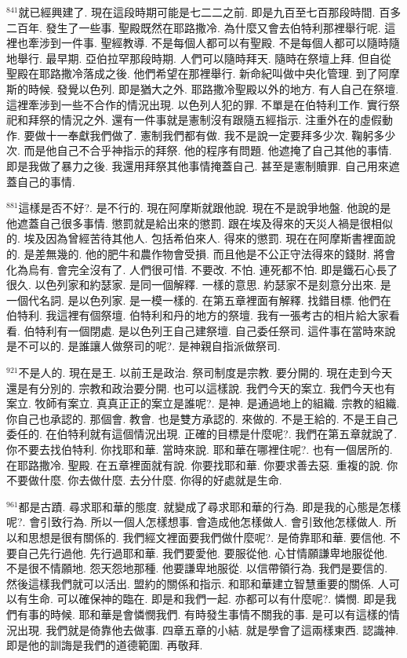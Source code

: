 \documentclass{book}
\begin{document}
$^{841}$就已經興建了.
現在這段時期可能是七二二之前.
即是九百至七百那段時間.
百多二百年.
發生了一些事.
聖殿既然在耶路撒冷.
為什麼又會去伯特利那裡舉行呢.
這裡也牽涉到一件事.
聖經教導.
不是每個人都可以有聖殿.
不是每個人都可以隨時隨地舉行.
最早期.
亞伯拉罕那段時期.
人們可以隨時拜天.
隨時在祭壇上拜.
但自從聖殿在耶路撒冷落成之後.
他們希望在那裡舉行.
新命紀叫做中央化管理.
到了阿摩斯的時候.
發覺以色列.
即是猶大之外.
耶路撒冷聖殿以外的地方.
有人自己在祭壇.
這裡牽涉到一些不合作的情況出現.
以色列人犯的罪.
不單是在伯特利工作.
實行祭祀和拜祭的情況之外.
還有一件事就是憲制沒有跟隨五經指示.
注重外在的虛假動作.
要做十一奉獻我們做了.
憲制我們都有做.
我不是說一定要拜多少次.
鞠躬多少次.
而是他自己不合乎神指示的拜祭.
他的程序有問題.
他遮掩了自己其他的事情.
即是我做了暴力之後.
我還用拜祭其他事情掩蓋自己.
甚至是憲制贖罪.
自己用來遮蓋自己的事情.

$^{881}$這樣是否不好?.
是不行的.
現在阿摩斯就跟他說.
現在不是說爭地盤.
他說的是他遮蓋自己很多事情.
懲罰就是給出來的懲罰.
跟在埃及得來的天災人禍是很相似的.
埃及因為曾經苦待其他人.
包括希伯來人.
得來的懲罰.
現在在阿摩斯書裡面說的.
是差無幾的.
他的肥牛和農作物會受損.
而且他是不公正守法得來的錢財.
將會化為烏有.
會完全沒有了.
人們很可惜.
不要改.
不怕.
連死都不怕.
即是鐵石心長了很久.
以色列家和約瑟家.
是同一個解釋.
一樣的意思.
約瑟家不是刻意分出來.
是一個代名詞.
是以色列家.
是一模一樣的.
在第五章裡面有解釋.
找錯目標.
他們在伯特利.
我這裡有個祭壇.
伯特利和丹的地方的祭壇.
我有一張考古的相片給大家看看.
伯特利有一個閉處.
是以色列王自己建祭壇.
自己委任祭司.
這件事在當時來說是不可以的.
是誰讓人做祭司的呢?.
是神親自指派做祭司.

$^{921}$不是人的.
現在是王.
以前王是政治.
祭司制度是宗教.
要分開的.
現在走到今天還是有分別的.
宗教和政治要分開.
也可以這樣說.
我們今天的案立.
我們今天也有案立.
牧師有案立.
真真正正的案立是誰呢?.
是神.
是通過地上的組織.
宗教的組織.
你自己也承認的.
那個會.
教會.
也是雙方承認的.
來做的.
不是王給的.
不是王自己委任的.
在伯特利就有這個情況出現.
正確的目標是什麼呢?.
我們在第五章就說了.
你不要去找伯特利.
你找耶和華.
當時來說.
耶和華在哪裡住呢?.
也有一個居所的.
在耶路撒冷.
聖殿.
在五章裡面就有說.
你要找耶和華.
你要求善去惡.
重複的說.
你不要做什麼.
你去做什麼.
去分什麼.
你得的好處就是生命.

$^{961}$都是古蹟.
尋求耶和華的態度.
就變成了尋求耶和華的行為.
即是我的心態是怎樣呢?.
會引致行為.
所以一個人怎樣想事.
會造成他怎樣做人.
會引致他怎樣做人.
所以和思想是很有關係的.
我們經文裡面要我們做什麼呢?.
是倚靠耶和華.
要信他.
不要自己先行過他.
先行過耶和華.
我們要愛他.
要服從他.
心甘情願謙卑地服從他.
不是很不情願地.
怨天怨地那種.
他要謙卑地服從.
以信帶領行為.
我們是要信的.
然後這樣我們就可以活出.
盟約的關係和指示.
和耶和華建立智慧重要的關係.
人可以有生命.
可以確保神的臨在.
即是和我們一起.
亦都可以有什麼呢?.
憐憫.
即是我們有事的時候.
耶和華是會憐憫我們.
有時發生事情不關我的事.
是可以有這樣的情況出現.
我們就是倚靠他去做事.
四章五章的小結.
就是學會了這兩樣東西.
認識神.
即是他的訓誨是我們的道德範圍.
再敬拜.
\end{document}
